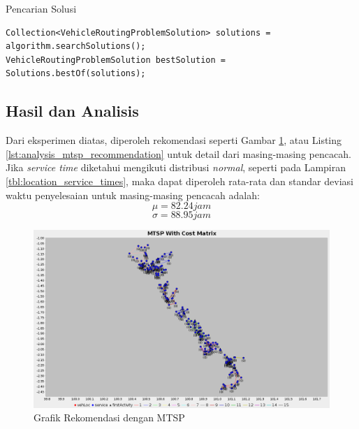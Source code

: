 \begin{listing}
	\caption{Pencarian Solusi}
	\label{lst:jsprit_search_solution}
	\begin{verbatim}
Collection<VehicleRoutingProblemSolution> solutions = algorithm.searchSolutions();
VehicleRoutingProblemSolution bestSolution = Solutions.bestOf(solutions);
	\end{verbatim}
\end{listing}


\subsection{Hasil dan Analisis}
Dari eksperimen diatas, diperoleh rekomendasi seperti Gambar \ref{fig:analysis_mtsp_recommendation}, atau Listing \ref{lst:analysis_mtsp_recommendation} untuk detail dari masing-masing pencacah. Jika \textit{service time} diketahui mengikuti distribusi \textit{normal}, seperti pada Lampiran \ref{tbl:location_service_times}, maka dapat diperoleh rata-rata dan standar deviasi waktu penyelesaian untuk masing-masing pencacah adalah:
$$ \mu = 82.24 jam $$
$$ \sigma = 88.95 jam $$


\begin{figure}[h]
	\centering
	\includegraphics[width=\textwidth]{../../Resources/Images/analysis_mtsp_no_time_windows}
	\caption{Grafik Rekomendasi dengan MTSP}
	\label{fig:analysis_mtsp_recommendation}
\end{figure}


